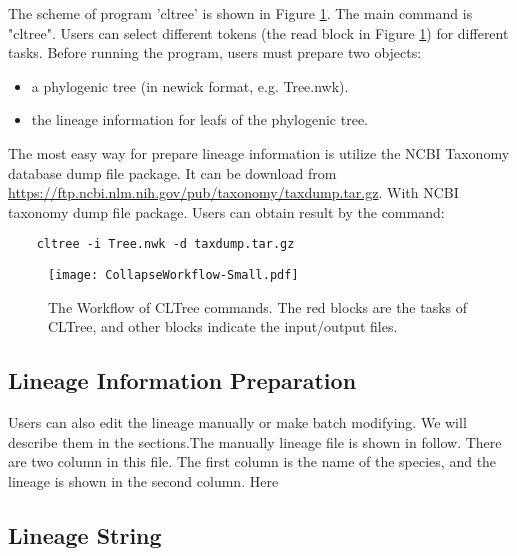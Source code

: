 \documentclass[12pt,a4paper]{article}
\begin{document}
The scheme of program 'cltree' is shown in Figure \ref{workflow}. The main command is "cltree". Users can select different tokens (the read block in Figure \ref{workflow}) for different tasks. Before running the program, users must prepare two objects:
\begin{itemize}
	\item a phylogenic tree (in newick format, e.g. Tree.nwk).
	\item the lineage information for leafs of the phylogenic tree.
\end{itemize}
The most easy way for prepare lineage information is utilize the NCBI Taxonomy database dump file package. It can be download from \url{https://ftp.ncbi.nlm.nih.gov/pub/taxonomy/taxdump.tar.gz}. With NCBI taxonomy dump file package. Users can obtain result by the command:
\begin{verbatim}
	cltree -i Tree.nwk -d taxdump.tar.gz
\end{verbatim}

\begin{figure}[!h]
	\centering
	\texttt{[image: CollapseWorkflow-Small.pdf]}
	\caption{The Workflow of CLTree commands. The red blocks are the tasks of CLTree, and other blocks indicate the input/output files.}
	\label{workflow}
\end{figure}

\subsection{Lineage Information Preparation}

Users can also edit the lineage manually or make batch modifying. We will describe them in the sections.The manually lineage file is shown in follow. There are two column in this file. The first column is the name of the species, and the lineage is shown in the second column. Here 



\subsection{Lineage String }
\end{document}
